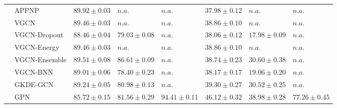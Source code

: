 \begin{table}[ht]
{\begin{tabular}{ll|lll|lll}
           & APPNP &    ${89.92 \pm 0.03}$ &               $n.a.$ & $n.a.$ &   $37.98 \pm 0.12$ &              $n.a.$ &               $n.a.$ \\
           & VGCN &    $89.46 \pm 0.03$ &               $n.a.$ &                $n.a.$ &   $38.86 \pm 0.10$ &              $n.a.$ &               $n.a.$ \\
           & VGCN-Dropout &    $88.46 \pm 0.04$ &    $79.03 \pm 0.08$ &                $n.a.$ &   $38.06 \pm 0.12$ &   $17.98 \pm 0.09$ &               $n.a.$ \\
           & VGCN-Energy &    $89.46 \pm 0.03$ &               $n.a.$ &                $n.a.$ &   $38.86 \pm 0.10$ &              $n.a.$ &               $n.a.$ \\
           & VGCN-Ensemble &    $89.51 \pm 0.08$ &    $86.61 \pm 0.09$ &                $n.a.$ &   $38.74 \pm 0.23$ &   $30.60 \pm 0.38$ &               $n.a.$ \\
           & VGCN-BNN &    $89.01 \pm 0.06$ &    $78.40 \pm 0.23$ &                $n.a.$ &   $38.17 \pm 0.17$ &   $19.06 \pm 0.20$ &               $n.a.$ \\
           & GKDE-GCN &    $89.24 \pm 0.05$ &    $80.98 \pm 0.13$ &                $n.a.$ &   $39.30 \pm 0.27$ &   $30.52 \pm 0.25$ &               $n.a.$ \\
           & GPN &    $85.72 \pm 0.15$ &    $81.56 \pm 0.29$ &     $\mathbf{94.41 \pm 0.11}$ &   $46.12 \pm 0.32$ &   $38.98 \pm 0.28$ &    $\mathbf{77.26 \pm 0.45}$ \\
           
           \midrule
     

\end{tabular}}
\end{table}
